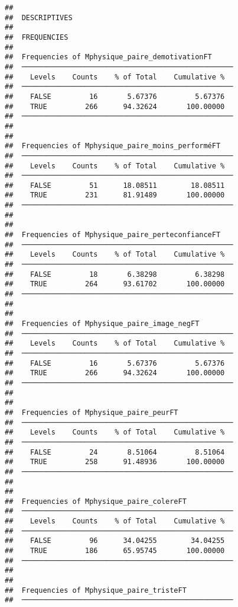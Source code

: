 \documentclass[
]{article}
\begin{document}
\begin{verbatim}
## 
##  DESCRIPTIVES
## 
##  FREQUENCIES
## 
##  Frequencies of Mphysique_paire_demotivationFT      
##  ────────────────────────────────────────────────── 
##    Levels    Counts    % of Total    Cumulative %   
##  ────────────────────────────────────────────────── 
##    FALSE         16       5.67376         5.67376   
##    TRUE         266      94.32624       100.00000   
##  ────────────────────────────────────────────────── 
## 
## 
##  Frequencies of Mphysique_paire_moins_performéFT    
##  ────────────────────────────────────────────────── 
##    Levels    Counts    % of Total    Cumulative %   
##  ────────────────────────────────────────────────── 
##    FALSE         51      18.08511        18.08511   
##    TRUE         231      81.91489       100.00000   
##  ────────────────────────────────────────────────── 
## 
## 
##  Frequencies of Mphysique_paire_perteconfianceFT    
##  ────────────────────────────────────────────────── 
##    Levels    Counts    % of Total    Cumulative %   
##  ────────────────────────────────────────────────── 
##    FALSE         18       6.38298         6.38298   
##    TRUE         264      93.61702       100.00000   
##  ────────────────────────────────────────────────── 
## 
## 
##  Frequencies of Mphysique_paire_image_negFT         
##  ────────────────────────────────────────────────── 
##    Levels    Counts    % of Total    Cumulative %   
##  ────────────────────────────────────────────────── 
##    FALSE         16       5.67376         5.67376   
##    TRUE         266      94.32624       100.00000   
##  ────────────────────────────────────────────────── 
## 
## 
##  Frequencies of Mphysique_paire_peurFT              
##  ────────────────────────────────────────────────── 
##    Levels    Counts    % of Total    Cumulative %   
##  ────────────────────────────────────────────────── 
##    FALSE         24       8.51064         8.51064   
##    TRUE         258      91.48936       100.00000   
##  ────────────────────────────────────────────────── 
## 
## 
##  Frequencies of Mphysique_paire_colereFT            
##  ────────────────────────────────────────────────── 
##    Levels    Counts    % of Total    Cumulative %   
##  ────────────────────────────────────────────────── 
##    FALSE         96      34.04255        34.04255   
##    TRUE         186      65.95745       100.00000   
##  ────────────────────────────────────────────────── 
## 
## 
##  Frequencies of Mphysique_paire_tristeFT            
##  ────────────────────────────────────────────────── 

\end{verbatim}
\end{document}

